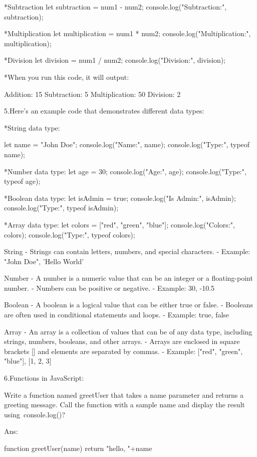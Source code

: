 *Subtraction
let subtraction = num1 - num2;
console.log("Subtraction:", subtraction);

*Multiplication
let multiplication = num1 * num2;
console.log("Multiplication:", multiplication);

*Division
let division = num1 / num2;
console.log("Division:", division);

*When you run this code, it will output:


Addition: 15
Subtraction: 5
Multiplication: 50
Division: 2

5.Here's an example code that demonstrates different data types:


*String data type:

let name = "John Doe";
console.log("Name:", name);
console.log("Type:", typeof name);

*Number data type:
let age = 30;
console.log("Age:", age);
console.log("Type:", typeof age);

*Boolean data type:
let isAdmin = true;
console.log("Is Admin:", isAdmin);
console.log("Type:", typeof isAdmin);

*Array data type:
let colors = ["red", "green", "blue"];
console.log("Colors:", colors);
console.log("Type:", typeof colors);


     
String
-      Strings can contain letters, numbers, and special characters.
-      Example: "John Doe", 'Hello World'

Number
-      A number is a numeric value that can be an integer or a floating-point number.
-      Numbers can be positive or negative.
-      Example: 30, -10.5

Boolean
-      A boolean is a logical value that can be either true or false.
-      Booleans are often used in conditional statements and loops.
-      Example: true, false

Array
-      An array is a collection of values that can be of any data type, including strings, numbers, booleans, and other arrays.
-      Arrays are enclosed in square brackets [] and elements are separated by commas.
-      Example: ["red", "green", "blue"], [1, 2, 3]


6.Functions in JavaScript:

Write a function named greetUser that takes a name parameter and returns a greeting message.
Call the function with a sample name and display the result using console.log()?

Ans:
     
function greetUser(name){
     return "hello, "+name
 }
 

